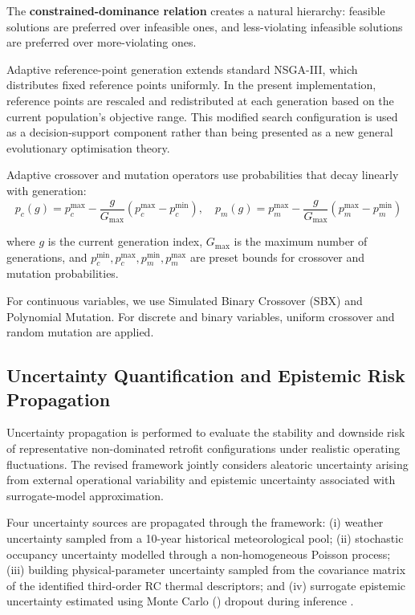 \documentclass[11pt]{article}
\providecommand{\MC}{\text{MC}}
\begin{document}
The \textbf{constrained-dominance relation} creates a natural hierarchy: feasible solutions are preferred over infeasible ones, and less-violating infeasible solutions are preferred over more-violating ones.

Adaptive reference-point generation extends standard NSGA-III, which distributes fixed reference points uniformly. In the present implementation, reference points are rescaled and redistributed at each generation based on the current population's objective range. This modified search configuration is used as a decision-support component rather than being presented as a new general evolutionary optimisation theory.

Adaptive crossover and mutation operators use probabilities that decay linearly with generation:
\begin{equation}
p_c(g) = p_c^{\max} - \frac{g}{G_{\max}}(p_c^{\max} - p_c^{\min}), \quad p_m(g) = p_m^{\max} - \frac{g}{G_{\max}}(p_m^{\max} - p_m^{\min})
\end{equation}

where $g$ is the current generation index, $G_{\max}$ is the maximum number of generations, and $p_c^{\min},p_c^{\max},p_m^{\min},p_m^{\max}$ are preset bounds for crossover and mutation probabilities.

For continuous variables, we use Simulated Binary Crossover (SBX) and Polynomial Mutation. For discrete and binary variables, uniform crossover and random mutation are applied.

\subsection{Uncertainty Quantification and Epistemic Risk Propagation}

Uncertainty propagation is performed to evaluate the stability and downside risk of representative non-dominated retrofit configurations under realistic operating fluctuations. The revised framework jointly considers aleatoric uncertainty arising from external operational variability and epistemic uncertainty associated with surrogate-model approximation.

Four uncertainty sources are propagated through the framework: (i) weather uncertainty sampled from a 10-year historical meteorological pool; (ii) stochastic occupancy uncertainty modelled through a non-homogeneous Poisson process; (iii) building physical-parameter uncertainty sampled from the covariance matrix of the identified third-order RC thermal descriptors; and (iv) surrogate epistemic uncertainty estimated using Monte Carlo (\MC) dropout during inference \cite{58}.
\end{document}
